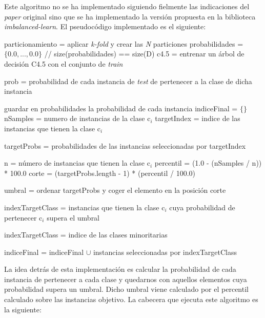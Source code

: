 Este algoritmo no se ha implementado siguiendo fielmente las indicaciones del \textit{paper} original sino que se ha implementado la versión propuesta en la biblioteca \textit{imbalanced-learn}. El pseudocódigo implementado es el siguiente:

\begin{codigo}
\begin{algorithmic}[1] \label{pseudocode:bc}
\State particionamiento = aplicar \textit{k-fold} y crear las \textit{N} particiones
\State probabilidades = $\{0.0, ..., 0.0\}$ // size(probabilidades) == size(D)
\State c4.5 = entrenar un árbol de decisión C4.5 con el conjunto de \textit{train}
\State \parbox[t]{305pt}{prob = probabilidad de cada instancia de \textit{test} de pertenecer a la clase de dicha instancia\strut}
\State guardar en probabilidades la probabilidad de cada instancia
\EndFor
\State indiceFinal = $\{\}$
\State nSamples = numero de instancias de la clase c$_i$
\State targetIndex = indice de las instancias que tienen la clase c$_i$
\State \parbox[t]{280pt}{targetProbs = probabilidades de las instancias seleccionadas por targetIndex\strut}
\end{algorithmic}
\end{codigo}
	
\begin{codigo}
\begin{algorithmic}[1]

\State n = número de instancias que tienen la clase c$_i$
\State percentil = (1.0 - (nSamples / n)) * 100.0
\State corte = (targetProbs.length - 1) * (percentil / 100.0)
\State \parbox[t]{280pt}{umbral = ordenar targetProbs y coger el elemento en la posición corte\strut}
\State \parbox[t]{280pt}{indexTargetClass = instancias que tienen la clase c$_i$ cuya probabilidad de pertenecer c$_i$ supera el umbral\strut}
\Else
\State indexTargetClass = indice de las clases minoritarias
\EndIf
\State \parbox[t]{280pt}{indiceFinal = indiceFinal $\cup$ instancias seleccionadas por indexTargetClass\strut}
\EndFor
\EndFunction 
\end{algorithmic}
\end{codigo}

La idea detrás de esta implementación es calcular la probabilidad de cada instancia de pertenecer a cada clase y quedarnos con aquellos elementos cuya probabilidad supera un umbral. Dicho umbral viene calculado por el percentil calculado sobre las instancias objetivo. La cabecera que ejecuta este algoritmo es la siguiente:

